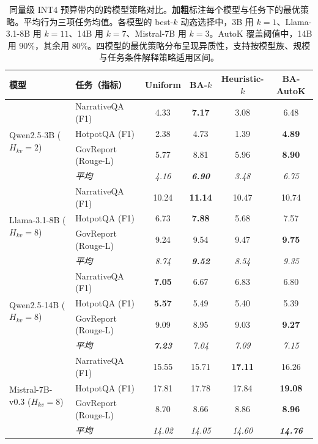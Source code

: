 \begin{table}[!htbp]
  \centering
  \small
  \setlength{\tabcolsep}{5pt}
  \begin{tabular}{l l cccc}
    \toprule
    \textbf{模型} & \textbf{任务（指标）} & Uniform & \textbf{BA-$k$} & Heuristic-$k$ & \textbf{BA-AutoK} \\
    \midrule
    \multirow{4}{*}{Qwen2.5-3B ($H_{kv}{=}2$)} & NarrativeQA (F1) & 4.33 & \textbf{7.17} & 3.08 & 6.48 \\
     & HotpotQA (F1) & 2.38 & 4.73 & 1.39 & \textbf{4.89} \\
     & GovReport (Rouge-L) & 5.77 & 8.81 & 5.96 & \textbf{8.90} \\
     & \textit{平均} & \textit{4.16} & \textit{\textbf{6.90}} & \textit{3.48} & \textit{6.75} \\
    \midrule
    \multirow{4}{*}{Llama-3.1-8B ($H_{kv}{=}8$)} & NarrativeQA (F1) & 10.24 & \textbf{11.14} & 10.47 & 10.74 \\
     & HotpotQA (F1) & 6.73 & \textbf{7.88} & 5.68 & 7.57 \\
     & GovReport (Rouge-L) & 9.24 & 9.54 & 9.47 & \textbf{9.75} \\
     & \textit{平均} & \textit{8.74} & \textit{\textbf{9.52}} & \textit{8.54} & \textit{9.35} \\
    \midrule
    \multirow{4}{*}{Qwen2.5-14B ($H_{kv}{=}8$)} & NarrativeQA (F1) & \textbf{7.05} & 6.67 & 6.83 & 6.80 \\
     & HotpotQA (F1) & \textbf{5.57} & 5.49 & 5.40 & 5.39 \\
     & GovReport (Rouge-L) & 9.09 & 8.95 & 9.03 & \textbf{9.27} \\
     & \textit{平均} & \textit{\textbf{7.23}} & \textit{7.04} & \textit{7.09} & \textit{7.15} \\
    \midrule
    \multirow{4}{*}{Mistral-7B-v0.3 ($H_{kv}{=}8$)} & NarrativeQA (F1) & 15.55 & 15.71 & \textbf{17.11} & 16.26 \\
     & HotpotQA (F1) & 17.81 & 17.78 & 17.84 & \textbf{19.08} \\
     & GovReport (Rouge-L) & 8.70 & 8.66 & 8.86 & \textbf{8.96} \\
     & \textit{平均} & \textit{14.02} & \textit{14.05} & \textit{14.60} & \textit{\textbf{14.76}} \\
    \bottomrule
  \end{tabular}
  \caption{同量级 INT4 预算带内的跨模型策略对比。\textbf{加粗}标注每个模型与任务下的最优策略。平均行为三项任务均值。各模型的 best-$k$ 动态选择中，3B 用 $k{=}1$、Llama-3.1-8B 用 $k{=}11$、14B 用 $k{=}7$、Mistral-7B 用 $k{=}3$。AutoK 覆盖阈值中，14B 用 90\%，其余用 80\%。四模型的最优策略分布呈现异质性，支持按模型族、规模与任务条件解释策略适用区间。}
  \label{tab:t3-cross-model-main}
  \par\smallskip{}
\end{table}
